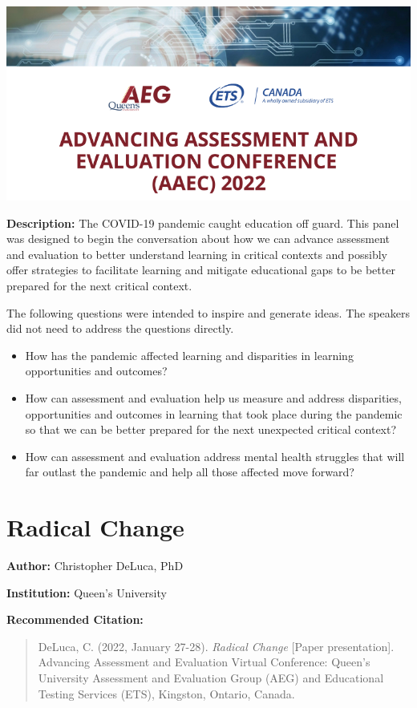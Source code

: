 \documentclass[
]{book}
\begin{document}
\includegraphics{Content/H.png}

\textbf{Description:} The COVID-19 pandemic caught education off guard. This panel was designed to begin the conversation about how we can advance assessment and evaluation to better understand learning in critical contexts and possibly offer strategies to facilitate learning and mitigate educational gaps to be better prepared for the next critical context.

The following questions were intended to inspire and generate ideas. The speakers did not need to address the questions directly.

\begin{itemize}
\item
  How has the pandemic affected learning and disparities in learning opportunities and outcomes?
\item
  How can assessment and evaluation help us measure and address disparities, opportunities and outcomes in learning that took place during the pandemic so that we can be better prepared for the next unexpected critical context?
\item
  How can assessment and evaluation address mental health struggles that will far outlast the pandemic and help all those affected move forward?
\end{itemize}

\newpage

\hypertarget{radical-change}{%
\section{Radical Change}\label{radical-change}}

\textbf{Author:} Christopher DeLuca, PhD

\textbf{Institution:} Queen's University

\textbf{Recommended Citation:}

\begin{quote}
DeLuca, C. (2022, January 27-28). \emph{Radical Change} {[}Paper presentation{]}. Advancing Assessment and Evaluation Virtual Conference: Queen's University Assessment and Evaluation Group (AEG) and Educational Testing Services (ETS), Kingston, Ontario, Canada.
\end{quote}
\end{document}
